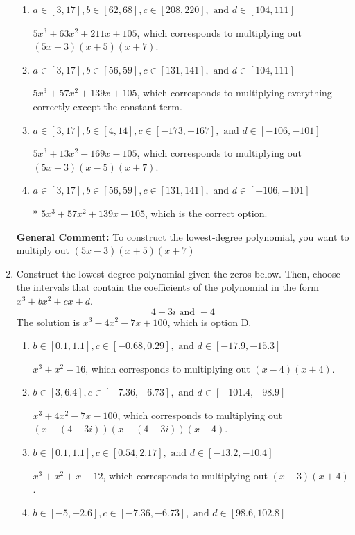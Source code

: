 \documentclass{extbook}[14pt]
\newcommand{\litem}[1]{\item #1

\rule{\textwidth}{0.4pt}}
\begin{document}
\begin{enumerate}
{\begin{enumerate}[label=\Alph*.]
$5x^{3} -57 x^{2} +139 x + 105$, which corresponds to multiplying out $(5x + 3)(x -5)(x -7)$.
\item \( a \in [3, 17], b \in [62, 68], c \in [208, 220], \text{ and } d \in [104, 111] \)

$5x^{3} +63 x^{2} +211 x + 105$, which corresponds to multiplying out $(5x + 3)(x + 5)(x + 7)$.
\item \( a \in [3, 17], b \in [56, 59], c \in [131, 141], \text{ and } d \in [104, 111] \)

$5x^{3} +57 x^{2} +139 x + 105$, which corresponds to multiplying everything correctly except the constant term.
\item \( a \in [3, 17], b \in [4, 14], c \in [-173, -167], \text{ and } d \in [-106, -101] \)

$5x^{3} +13 x^{2} -169 x -105$, which corresponds to multiplying out $(5x + 3)(x -5)(x + 7)$.
\item \( a \in [3, 17], b \in [56, 59], c \in [131, 141], \text{ and } d \in [-106, -101] \)

* $5x^{3} +57 x^{2} +139 x -105$, which is the correct option.
\end{enumerate}

\textbf{General Comment:} To construct the lowest-degree polynomial, you want to multiply out $(5x -3)(x + 5)(x + 7)$
}
\litem{
Construct the lowest-degree polynomial given the zeros below. Then, choose the intervals that contain the coefficients of the polynomial in the form $x^3+bx^2+cx+d$.
\[ 4 + 3 i \text{ and } -4 \]The solution is \( x^{3} -4 x^{2} -7 x + 100 \), which is option D.\begin{enumerate}[label=\Alph*.]
\item \( b \in [0.1, 1.1], c \in [-0.68, 0.29], \text{ and } d \in [-17.9, -15.3] \)

$x^{3} + x^{2} -16$, which corresponds to multiplying out $(x -4)(x + 4)$.
\item \( b \in [3, 6.4], c \in [-7.36, -6.73], \text{ and } d \in [-101.4, -98.9] \)

$x^{3} +4 x^{2} -7 x -100$, which corresponds to multiplying out $(x-(4 + 3 i))(x-(4 - 3 i))(x -4)$.
\item \( b \in [0.1, 1.1], c \in [0.54, 2.17], \text{ and } d \in [-13.2, -10.4] \)

$x^{3} + x^{2} +x -12$, which corresponds to multiplying out $(x -3)(x + 4)$.
\item \( b \in [-5, -2.6], c \in [-7.36, -6.73], \text{ and } d \in [98.6, 102.8] \)


\end{enumerate}}
\end{enumerate}
\end{document}
